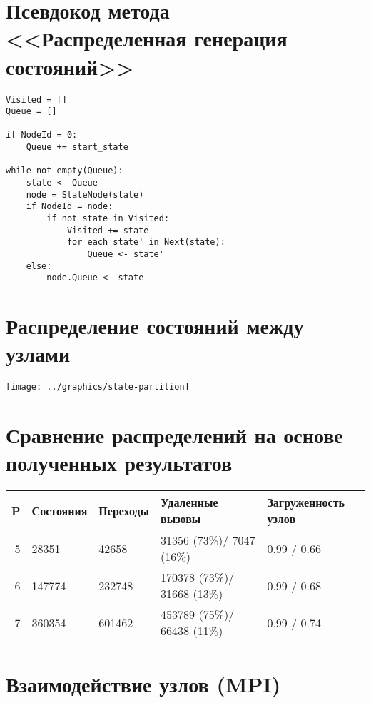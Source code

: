 \documentclass[12pt]{article}
\begin{document}
\section{Псевдокод метода \\ <<Распределенная генерация состояний>>}
\label{sec:par-pseudocode}

\scriptsize
\begin{verbatim}
Visited = []
Queue = []

if NodeId = 0:
    Queue += start_state

while not empty(Queue):
    state <- Queue
    node = StateNode(state)
    if NodeId = node:
        if not state in Visited:
            Visited += state
            for each state' in Next(state):
                Queue <- state'
    else:
        node.Queue <- state
\end{verbatim}
\normalsize

\section{Распределение состояний между узлами}
\label{sec:state-partitioning}

\begin{center}
  \texttt{[image: ../graphics/state-partition]}
\end{center}

\section{Сравнение распределений на основе полученных результатов}
\label{sec:partition-compare}

\begin{tabular}[ht]{|r|l|l|p{}|p{}|}
  \hline 
  P & Состояния & Переходы & Удаленные вызовы & Загруженность узлов    \\ \hline
  5 & 28351     & 42658    & 31356  (73\%)/ 7047  (16\%) & 0.99 / 0.66 \\ \hline
  6 & 147774    & 232748   & 170378 (73\%)/ 31668 (13\%) & 0.99 / 0.68 \\ \hline
  7 & 360354    & 601462   & 453789 (75\%)/ 66438 (11\%) & 0.99 / 0.74 \\ \hline
\end{tabular}

\section{Взаимодействие узлов (MPI)}
\label{sec:mpi-interaction}
\end{document}
